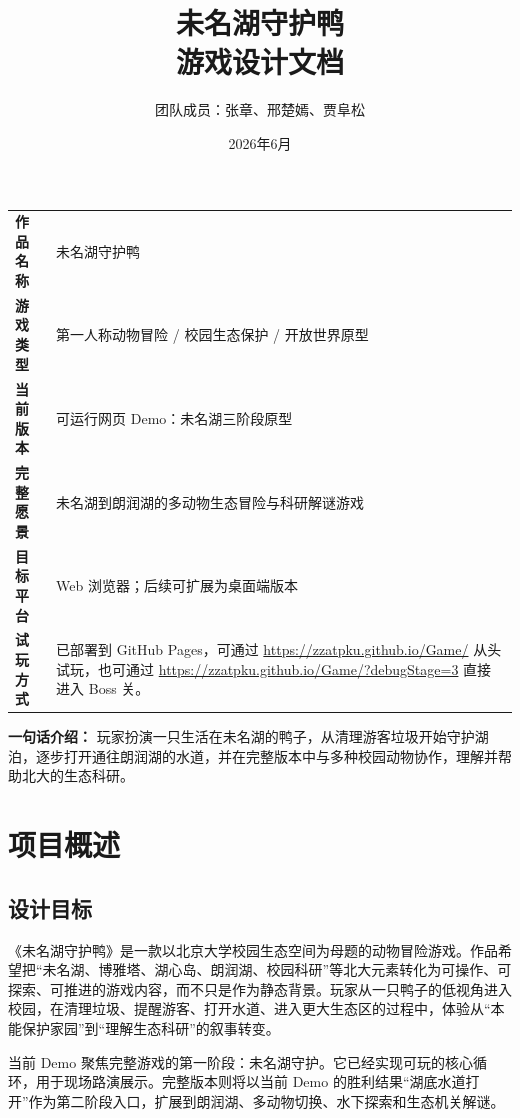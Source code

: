 \documentclass[UTF8,a4paper,12pt]{ctexart}
\title{\heiti 未名湖守护鸭\\游戏设计文档}
\author{团队成员：张章、邢楚嫣、贾阜松}
\date{2026年6月}
\begin{document}
\maketitle
\thispagestyle{empty}

\begin{center}
\begin{tabularx}{0.92\textwidth}{>{\bfseries}p{3.2cm}Y}
\toprule
作品名称 & 未名湖守护鸭 \\
游戏类型 & 第一人称动物冒险 / 校园生态保护 / 开放世界原型 \\
当前版本 & 可运行网页 Demo：未名湖三阶段原型 \\
完整愿景 & 未名湖到朗润湖的多动物生态冒险与科研解谜游戏 \\
目标平台 & Web 浏览器；后续可扩展为桌面端版本 \\
试玩方式 & 已部署到 GitHub Pages，可通过 \url{https://zzatpku.github.io/Game/} 从头试玩，也可通过 \url{https://zzatpku.github.io/Game/?debugStage=3} 直接进入 Boss 关。 \\
\bottomrule
\end{tabularx}
\end{center}

\vspace{1em}

\noindent\textbf{一句话介绍：}
玩家扮演一只生活在未名湖的鸭子，从清理游客垃圾开始守护湖泊，逐步打开通往朗润湖的水道，并在完整版本中与多种校园动物协作，理解并帮助北大的生态科研。

\newpage
\tableofcontents
\newpage

\section{项目概述}

\subsection{设计目标}

《未名湖守护鸭》是一款以北京大学校园生态空间为母题的动物冒险游戏。作品希望把``未名湖、博雅塔、湖心岛、朗润湖、校园科研''等北大元素转化为可操作、可探索、可推进的游戏内容，而不只是作为静态背景。玩家从一只鸭子的低视角进入校园，在清理垃圾、提醒游客、打开水道、进入更大生态区的过程中，体验从``本能保护家园''到``理解生态科研''的叙事转变。

当前 Demo 聚焦完整游戏的第一阶段：未名湖守护。它已经实现可玩的核心循环，用于现场路演展示。完整版本则将以当前 Demo 的胜利结果``湖底水道打开''作为第二阶段入口，扩展到朗润湖、多动物切换、水下探索和生态机关解谜。
\end{document}
